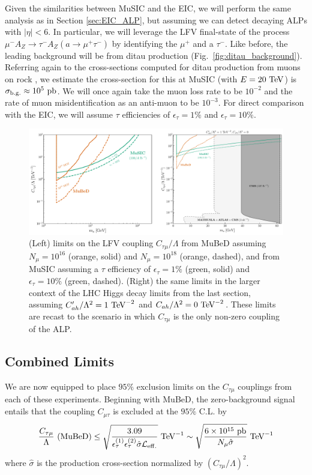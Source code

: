 Given the similarities between MuSIC and the EIC, we will perform the same analysis as in Section \ref{sec:EIC_ALP}, but assuming we can detect decaying ALPs with $|\eta| < 6$. In particular, we will leverage the LFV final-state of the process $\mu^-A_Z \rightarrow \tau^- A_Z (a\rightarrow \mu^+\tau^-)$ by identifying the $\mu^+$ and a $\tau^-$. Like before, the leading background will be from ditau production (Fig.~\ref{fig:ditau_background}). Referring again to the cross-sections computed for ditau production from muons on rock \cite{Bulmahn:2008fa}, we estimate the cross-section for this at MuSIC (with $E = 20~{\rm TeV}$) is $\sigma_{\rm b.g.} \approx 10^5~{\rm pb}$. We will once again take the muon loss rate to be $10^{-2}$ and the rate of muon misidentification as an anti-muon to be $10^{-3}$. For direct comparison with the EIC, we will assume $\tau$ efficiencies of $\epsilon_\tau = 1\%$ and $\epsilon_\tau = 10\%$.
\begin{figure}[t!]
    \centering
    \includegraphics[width=\linewidth]{figures/chapter5/MuSIC_MuBeD_ALP_limits.pdf}
    \caption[Projected constraints on LFV ALPs at the MuBeD and MuSIC.]{(Left) limits on the LFV coupling $C_{\tau\mu}/\Lambda$ from MuBeD assuming $N_\mu = 10^{16}$ (orange, solid) and $N_\mu = 10^{18}$ (orange, dashed), and from MuSIC assuming a $\tau$ efficiency of $\epsilon_\tau = 1\%$ (green, solid) and $\epsilon_\tau = 10\%$ (green, dashed). (Right) the same limits in the larger context of the LHC Higgs decay limits from the last section, assuming $C_{ah}'/\Lambda^2 = 1~{\rm TeV}^{-2}$ and $C_{ah}/\Lambda^2 = 0~{\rm TeV}^{-2}$. These limits are recast to the scenario in which $C_{\tau\mu}$ is the only non-zero coupling of the ALP.}
    \label{fig:EIC_ALP_limits}
\end{figure}
\subsection{Combined Limits}\label{sec:MuBeD_MuSIC_ALP_limits}
We are now equipped to place $95\%$ exclusion limits on the $C_{\tau\mu}$ couplings from each of these experiments. Beginning with MuBeD, the zero-background signal entails that the coupling $C_{\mu\tau}$ is excluded at the $95\%$ C.L. by
\begin{align}
    \frac{C_{\tau\mu}}{\Lambda}~{({\rm MuBeD})} \leq \sqrt{\frac{3.09}{\epsilon_\tau^{(1)}\epsilon_\tau^{(2)}\hat{\sigma}{\cal L}_{\rm eff.}}}~{\rm TeV}^{-1} \sim \sqrt{\frac{6\times 10^{15}~{\rm pb}}{N_\mu \hat{\sigma}}}~{\rm TeV}^{-1}
\end{align}
where $\hat{\sigma}$ is the production cross-section normalized by $(C_{\tau\mu}/\Lambda)^2$. 


